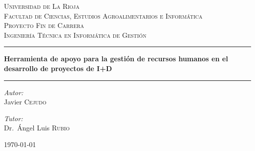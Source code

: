 \begin{titlepage}

\begin{center}

\begin{center}
\end{center}

\vspace{3mm}

\textsc{\LARGE Universidad de La Rioja}\\[0.5cm]

\textsc{\large Facultad de Ciencias, Estudios Agroalimentarios e
Informática}\\[0.5cm]

\textsc{\Large Proyecto Fin de Carrera}\\[0.5cm]

\textsc{\large Ingeniería Técnica en Informática de Gestión}\\[0.5cm]

\vspace{10mm}\hrule\vspace{5mm}
{ \LARGE \bfseries Herramienta de apoyo para la
gestión de recursos humanos en el desarrollo de proyectos de I+D}
\vspace{5mm}\hrule\vspace{10mm}

\begin{minipage}{0.4\textwidth}
\begin{flushleft} \large
\emph{Autor:}\\
Javier \textsc{Cejudo}
\end{flushleft}
\end{minipage}
\begin{minipage}{0.4\textwidth}
\begin{flushright} \large
\emph{Tutor:} \\
Dr.~Ángel Luis \textsc{Rubio}
\end{flushright}
\end{minipage}

\vfill

{\large \today}

\end{center}

\end{titlepage}